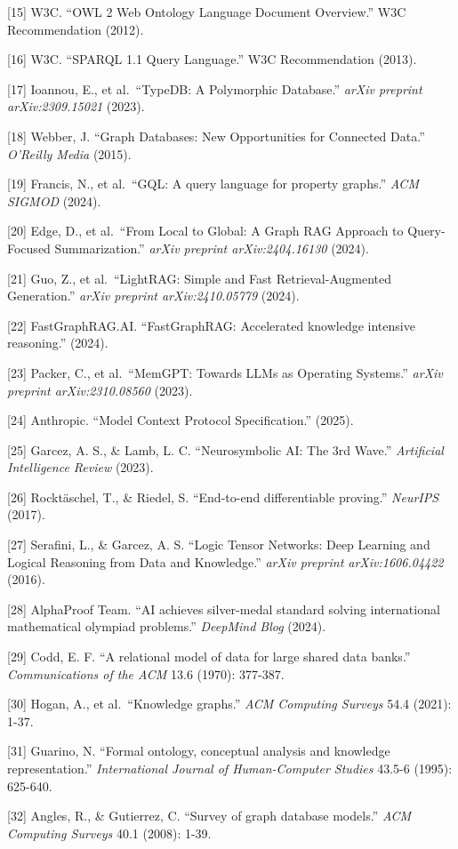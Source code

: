 \documentclass[11pt,a4paper]{ctexart}
\begin{document}
{[}15{]} W3C. ``OWL 2 Web Ontology Language Document Overview.'' W3C
Recommendation (2012).

{[}16{]} W3C. ``SPARQL 1.1 Query Language.'' W3C Recommendation (2013).

{[}17{]} Ioannou, E., et al.~``TypeDB: A Polymorphic Database.''
\emph{arXiv preprint arXiv:2309.15021} (2023).

{[}18{]} Webber, J. ``Graph Databases: New Opportunities for Connected
Data.'' \emph{O'Reilly Media} (2015).

{[}19{]} Francis, N., et al.~``GQL: A query language for property
graphs.'' \emph{ACM SIGMOD} (2024).

{[}20{]} Edge, D., et al.~``From Local to Global: A Graph RAG Approach
to Query-Focused Summarization.'' \emph{arXiv preprint arXiv:2404.16130}
(2024).

{[}21{]} Guo, Z., et al.~``LightRAG: Simple and Fast Retrieval-Augmented
Generation.'' \emph{arXiv preprint arXiv:2410.05779} (2024).

{[}22{]} FastGraphRAG.AI. ``FastGraphRAG: Accelerated knowledge
intensive reasoning.'' (2024).

{[}23{]} Packer, C., et al.~``MemGPT: Towards LLMs as Operating
Systems.'' \emph{arXiv preprint arXiv:2310.08560} (2023).

{[}24{]} Anthropic. ``Model Context Protocol Specification.'' (2025).

{[}25{]} Garcez, A. S., \& Lamb, L. C. ``Neurosymbolic AI: The 3rd
Wave.'' \emph{Artificial Intelligence Review} (2023).

{[}26{]} Rocktäschel, T., \& Riedel, S. ``End-to-end differentiable
proving.'' \emph{NeurIPS} (2017).

{[}27{]} Serafini, L., \& Garcez, A. S. ``Logic Tensor Networks: Deep
Learning and Logical Reasoning from Data and Knowledge.'' \emph{arXiv
preprint arXiv:1606.04422} (2016).

{[}28{]} AlphaProof Team. ``AI achieves silver-medal standard solving
international mathematical olympiad problems.'' \emph{DeepMind Blog}
(2024).

{[}29{]} Codd, E. F. ``A relational model of data for large shared data
banks.'' \emph{Communications of the ACM} 13.6 (1970): 377-387.

{[}30{]} Hogan, A., et al.~``Knowledge graphs.'' \emph{ACM Computing
Surveys} 54.4 (2021): 1-37.

{[}31{]} Guarino, N. ``Formal ontology, conceptual analysis and
knowledge representation.'' \emph{International Journal of
Human-Computer Studies} 43.5-6 (1995): 625-640.

{[}32{]} Angles, R., \& Gutierrez, C. ``Survey of graph database
models.'' \emph{ACM Computing Surveys} 40.1 (2008): 1-39.
\end{document}
